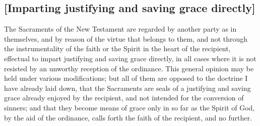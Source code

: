 \documentclass[
  english,
]{book}
\begin{document}
\hypertarget{imparting-justifying-and-saving-grace-directly}{%
\subsection{{[}Imparting justifying and saving grace directly{]}}\label{imparting-justifying-and-saving-grace-directly}}

The Sacraments of the New Testament are regarded by another party as in themselves, and by reason of the virtue that belongs to them, and not through the instrumentality of the faith or the Spirit in the heart of the recipient, effectual to impart justifying and saving grace directly, in all cases where it is not resisted by an unworthy reception of the ordinance. This general opinion may be held under various modifications; but all of them are opposed to the doctrine I have already laid down, that the Sacraments are seals of a justifying and saving grace already enjoyed by the recipient, and not intended for the conversion of sinners; and that they become means of grace only in so far as the Spirit of God, by the aid of the ordinance, calls forth the faith of the recipient, and no further.
\end{document}
